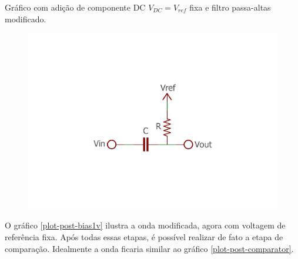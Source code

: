 	\begin{chart}[h]
		\caption{\label{plot-post-bias1v}Gráfico com adição de componente DC $V_{DC} = V_{ref}$ fixa e filtro passa-altas modificado.}
		\begin{subfigure}{.5\textwidth}
			\centering
		\end{subfigure}
		\begin{subfigure}{.5\textwidth}
			\centering
			\includegraphics[width=1\textwidth, trim={3cm 0cm 3cm 3cm},clip]{circuits/highpass_filter_bias.pdf}
		\end{subfigure}
	\end{chart}

	O gráfico \ref{plot-post-bias1v} ilustra a onda modificada, agora com voltagem de referência fixa. Após todas essas etapas, é possível realizar de fato a etapa de comparação. Idealmente a onda ficaria similar ao gráfico \ref{plot-post-comparator}.

